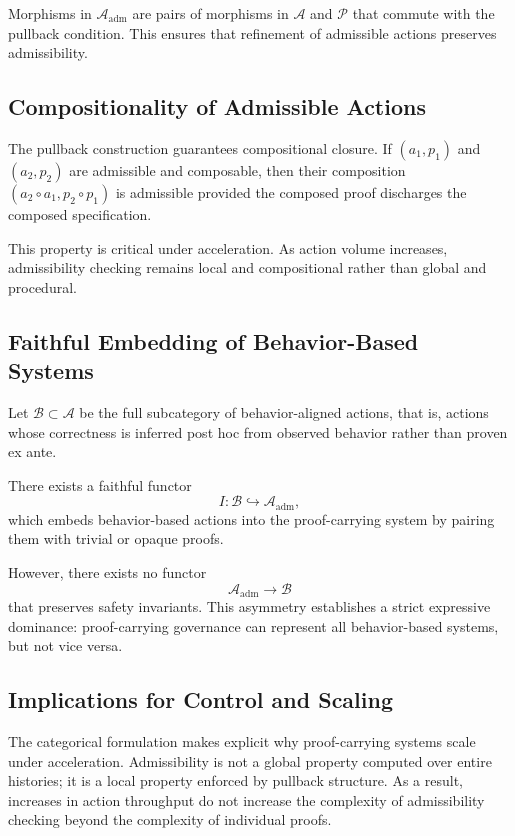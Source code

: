 \documentclass[11pt,oneside]{article}
\begin{document}
Morphisms in \( \mathcal{A}_{\mathrm{adm}} \) are pairs of morphisms in \( \mathcal{A} \) and \( \mathcal{P} \) that commute with the pullback condition. This ensures that refinement of admissible actions preserves admissibility.

\subsection{Compositionality of Admissible Actions}

The pullback construction guarantees compositional closure. If \( (a_1, p_1) \) and \( (a_2, p_2) \) are admissible and composable, then their composition \( (a_2 \circ a_1, p_2 \circ p_1) \) is admissible provided the composed proof discharges the composed specification.

This property is critical under acceleration. As action volume increases, admissibility checking remains local and compositional rather than global and procedural.

\subsection{Faithful Embedding of Behavior-Based Systems}

Let \( \mathcal{B} \subset \mathcal{A} \) be the full subcategory of behavior-aligned actions, that is, actions whose correctness is inferred post hoc from observed behavior rather than proven ex ante.

There exists a faithful functor
\[
I : \mathcal{B} \hookrightarrow \mathcal{A}_{\mathrm{adm}},
\]
which embeds behavior-based actions into the proof-carrying system by pairing them with trivial or opaque proofs.

However, there exists no functor
\[
\mathcal{A}_{\mathrm{adm}} \to \mathcal{B}
\]
that preserves safety invariants. This asymmetry establishes a strict expressive dominance: proof-carrying governance can represent all behavior-based systems, but not vice versa.

\subsection{Implications for Control and Scaling}

The categorical formulation makes explicit why proof-carrying systems scale under acceleration. Admissibility is not a global property computed over entire histories; it is a local property enforced by pullback structure. As a result, increases in action throughput do not increase the complexity of admissibility checking beyond the complexity of individual proofs.
\end{document}
